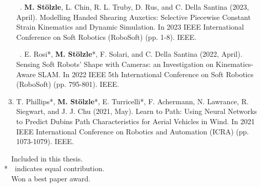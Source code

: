 \begin{enumerate}
    \item[\faFileTextO \, \stepcounter{enumi}\arabic{enumi}.] \textbf{M. Stölzle}, L. Chin, R. L. Truby, D. Rus, and C. Della Santina (2023, April). Modelling Handed Shearing Auxetics: Selective Piecewise Constant Strain Kinematics and Dynamic Simulation. In 2023 IEEE International Conference on Soft Robotics (RoboSoft) (pp. 1-8). IEEE.
    \item[\faFileTextO \, \stepcounter{enumi}\arabic{enumi}.] E. Rosi*, \textbf{M. Stölzle}*, F. Solari, and C. Della Santina (2022, April). Sensing Soft Robots' Shape with Cameras: an Investigation on Kinematics-Aware SLAM. In 2022 IEEE 5th International Conference on Soft Robotics (RoboSoft) (pp. 795-801). IEEE.
    \item T. Phillips*, \textbf{M. Stölzle}*, E. Turricelli*, F. Achermann, N. Lawrance, R. Siegwart, and J. J. Chu (2021, May). Learn to Path: Using Neural Networks to Predict Dubins Path Characteristics for Aerial Vehicles in Wind. In 2021 IEEE International Conference on Robotics and Automation (ICRA) (pp. 1073-1079). IEEE.
\end{enumerate}

\vspace{0.5cm}
\noindent
\faFileTextO~~Included in this thesis.\\
*~~indicates equal contribution.\\
\faTrophy~~Won a best paper award.

